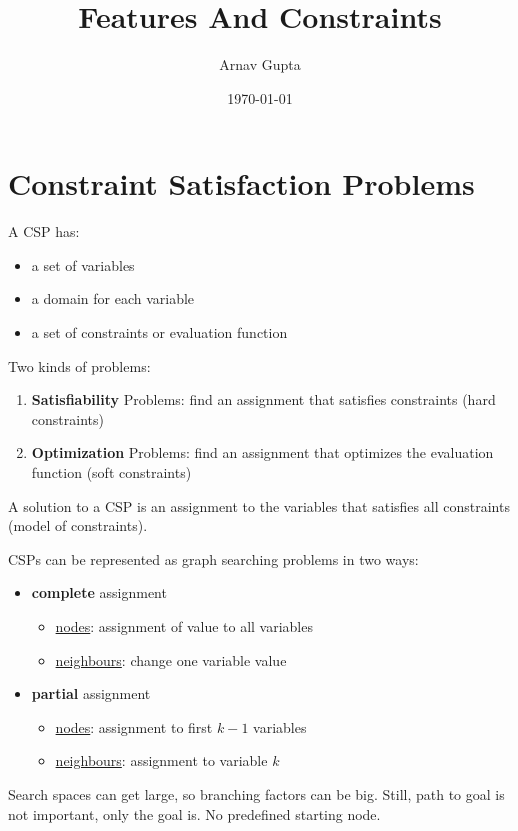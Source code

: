 \documentclass[11pt]{article}
\author{Arnav Gupta}
\date{\today}
\title{Features And Constraints}
\begin{document}
\maketitle
\tableofcontents

\section{Constraint Satisfaction Problems}
\label{sec:orgfee9b84}
A CSP has:
\begin{itemize}
\item a set of variables
\item a domain for each variable
\item a set of constraints or evaluation function
\end{itemize}

Two kinds of problems:
\begin{enumerate}
\item \textbf{Satisfiability} Problems: find an assignment that satisfies constraints (hard constraints)
\item \textbf{Optimization} Problems: find an assignment that optimizes the evaluation function (soft constraints)
\end{enumerate}

A solution to a CSP is an assignment to the variables that satisfies all constraints (model of constraints).

CSPs can be represented as graph searching problems in two ways:
\begin{itemize}
\item \textbf{complete} assignment
\begin{itemize}
\item \uline{nodes}: assignment of value to all variables
\item \uline{neighbours}: change one variable value
\end{itemize}
\item \textbf{partial} assignment
\begin{itemize}
\item \uline{nodes}: assignment to first \(k-1\) variables
\item \uline{neighbours}: assignment to variable \(k\)
\end{itemize}
\end{itemize}

Search spaces can get large, so branching factors can be big.
Still, path to goal is not important, only the goal is.
No predefined starting node.
\end{document}
